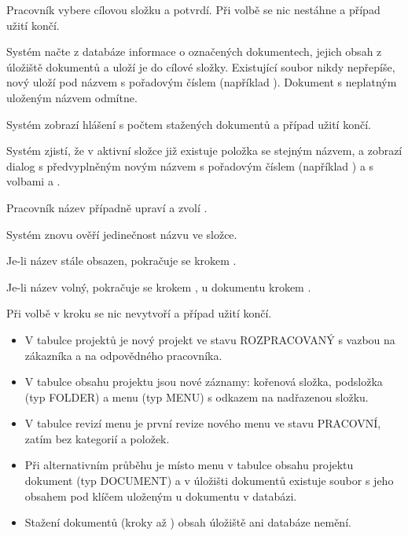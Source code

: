 \begin{ucalt}
  \item[7.10]\label{uc:02:7.10} Pracovník vybere cílovou složku a potvrdí. Při volbě  se nic nestáhne a případ užití končí.
  \item[7.11]\label{uc:02:7.11} Systém načte z databáze informace o označených dokumentech, jejich obsah z úložiště dokumentů a uloží je do cílové složky. Existující soubor nikdy nepřepíše, nový uloží pod názvem s pořadovým číslem (například ). Dokument s neplatným uloženým názvem odmítne. 
  \item[7.12]\label{uc:02:7.12} Systém zobrazí hlášení s počtem stažených dokumentů a případ užití končí.
\end{ucalt}

\begin{ucalt}
  \item[8.1]\label{uc:02:8.1} Systém zjistí, že v aktivní složce již existuje položka se stejným názvem, a zobrazí dialog s předvyplněným novým názvem s pořadovým číslem (například ) a s volbami  a .
  \item[8.2]\label{uc:02:8.2} Pracovník název případně upraví a zvolí .
  \item[8.3]\label{uc:02:8.3} Systém znovu ověří jedinečnost názvu ve složce.
  \item[8.4]\label{uc:02:8.4} Je-li název stále obsazen, pokračuje se krokem .
  \item[8.5]\label{uc:02:8.5} Je-li název volný, pokračuje se krokem , u dokumentu krokem .
\end{ucalt}
Při volbě  v kroku  se nic nevytvoří a případ užití končí.

\begin{itemize}[itemsep=0pt]
  \item V tabulce projektů je nový projekt ve stavu ROZPRACOVANÝ s vazbou na zákazníka a na odpovědného pracovníka.
  \item V tabulce obsahu projektu jsou nové záznamy: kořenová složka, podsložka (typ FOLDER) a menu (typ MENU) s odkazem na nadřazenou složku.
  \item V tabulce revizí menu je první revize nového menu ve stavu PRACOVNÍ, zatím bez kategorií a položek.
  \item Při alternativním průběhu  je místo menu v tabulce obsahu projektu dokument (typ DOCUMENT) a v úložišti dokumentů existuje soubor s jeho obsahem pod klíčem uloženým u dokumentu v databázi.
  \item Stažení dokumentů (kroky  až ) obsah úložiště ani databáze nemění.
\end{itemize}

